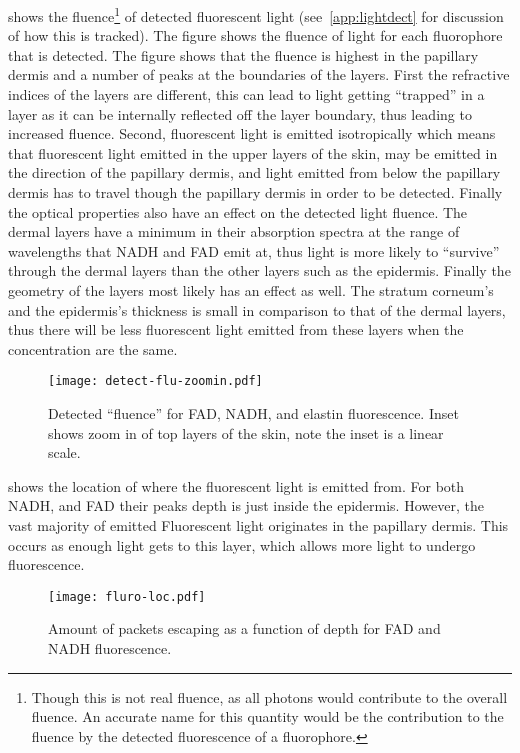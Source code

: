  shows the fluence\footnote{Though this is not real fluence, as all photons would contribute to the overall fluence. An accurate name for this quantity would be the contribution to the fluence by the detected fluorescence of a fluorophore.} of detected fluorescent light (see~\cref{app:lightdect} for discussion of how this is tracked).
The figure shows the fluence of light for each fluorophore that is detected.
The figure shows that the fluence is highest in the papillary dermis and a number of peaks at the boundaries of the layers.
First the refractive indices of the layers are different, this can lead to light getting ``trapped'' in a layer as it can be internally reflected off the layer boundary, thus leading to increased fluence.
Second, fluorescent light is emitted isotropically which means that fluorescent light emitted in the upper layers of the skin, may be emitted in the direction of the papillary dermis, and light emitted from below the papillary dermis has to travel though the papillary dermis in order to be detected.
Finally the optical properties also have an effect on the detected light fluence.
The dermal layers have a minimum in their absorption spectra at the range of wavelengths that NADH and FAD emit at, thus light is more likely to ``survive'' through the dermal layers than the other layers such as the epidermis.
Finally the geometry of the layers most likely has an effect as well.
The stratum corneum's and the epidermis's thickness is small in comparison to that of the dermal layers, thus there will be less fluorescent light emitted from these layers when the concentration are the same.

\begin{figure}[!htpb]
    \centering
    \texttt{[image: detect-flu-zoomin.pdf]}
    \caption{Detected ``fluence'' for FAD, NADH, and elastin fluorescence. Inset shows zoom in of top layers of the skin, note the inset is a linear scale.}
    \label{fig:fadnadhboth}
\end{figure}

 shows the location of where the fluorescent light is emitted from.
For both NADH, and FAD their peaks depth is just inside the epidermis.
However, the vast majority of emitted Fluorescent light originates in the papillary dermis.
This occurs as enough light gets to this layer, which allows more light to undergo fluorescence. 


\begin{figure}[!htpb]
    \centering
    \texttt{[image: fluro-loc.pdf]}
    \caption{Amount of packets escaping as a function of depth for FAD and NADH fluorescence.}
    \label{fig:floc}
\end{figure}

